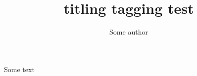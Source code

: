 \documentclass{article}
\title{titling tagging test}
\author{Some author}
\begin{document}
\maketitle
Some text
\end{document}
